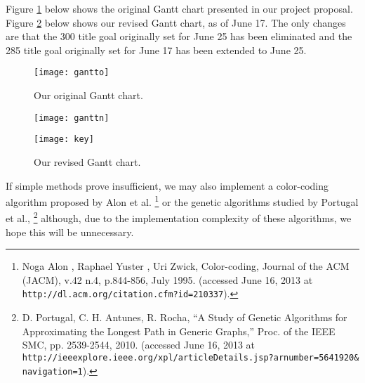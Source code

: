 \documentclass[11pt,english]{article}
\begin{document}
Figure \ref{fig:gantto} below shows the original Gantt chart presented in
our project proposal. Figure \ref{fig:ganttn} below shows our revised Gantt
chart, as of June 17. The only changes are that the 300 title goal originally
set for June 25 has been eliminated and the 285 title goal originally set for
June 17 has been extended to June 25.
\begin{figure}[h]
\begin{center}
\texttt{[image: gantto]}
\end{center}
\vspace{-0.7cm}
\caption{Our original Gantt chart.}
\label{fig:gantto}
\end{figure}
\begin{figure}[h]
\begin{center}
\texttt{[image: ganttn]}
\end{center}
\vspace{-0.7cm}
\caption{Our revised Gantt chart.}
\label{fig:ganttn}
\texttt{[image: key]}
\end{figure}

If simple methods prove insufficient, we may also implement a color-coding
algorithm proposed by Alon et al.\hspace{-0.2cm}
\footnote{Noga Alon , Raphael Yuster , Uri Zwick, Color-coding, Journal of the
ACM (JACM), v.42 n.4, p.844-856, July 1995. (accessed June 16, 2013 at
\texttt{http://dl.acm.org/citation.cfm?id=210337}).}
or the genetic algorithms studied by Portugal et al.,\hspace{-0.2cm}
\footnote{
D. Portugal, C. H. Antunes, R. Rocha, ``A Study of Genetic Algorithms for
Approximating the Longest Path in Generic Graphs,'' Proc. of the IEEE SMC, pp.
2539-2544, 2010. (accessed June 16, 2013 at
\texttt{http://ieeexplore.ieee.org/xpl/articleDetails.jsp?arnumber=5641920\&
navigation=1}).}
although, due to the implementation complexity of these algorithms, we hope
this will be unnecessary.
\end{document}
